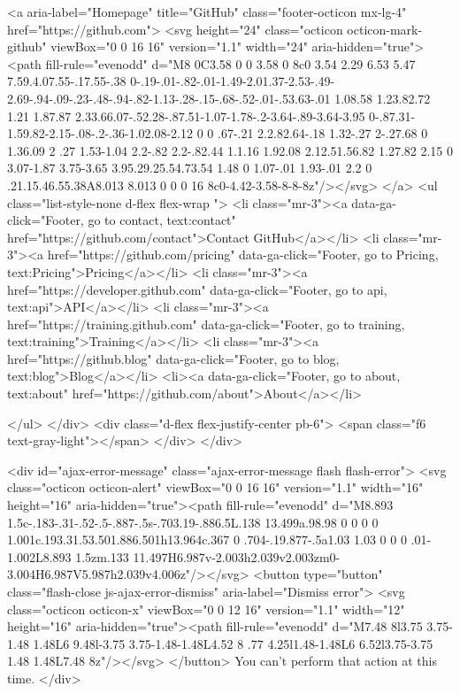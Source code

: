     <a aria-label="Homepage" title="GitHub" class="footer-octicon mx-lg-4" href="https://github.com">
      <svg height="24" class="octicon octicon-mark-github" viewBox="0 0 16 16" version="1.1" width="24" aria-hidden="true"><path fill-rule="evenodd" d="M8 0C3.58 0 0 3.58 0 8c0 3.54 2.29 6.53 5.47 7.59.4.07.55-.17.55-.38 0-.19-.01-.82-.01-1.49-2.01.37-2.53-.49-2.69-.94-.09-.23-.48-.94-.82-1.13-.28-.15-.68-.52-.01-.53.63-.01 1.08.58 1.23.82.72 1.21 1.87.87 2.33.66.07-.52.28-.87.51-1.07-1.78-.2-3.64-.89-3.64-3.95 0-.87.31-1.59.82-2.15-.08-.2-.36-1.02.08-2.12 0 0 .67-.21 2.2.82.64-.18 1.32-.27 2-.27.68 0 1.36.09 2 .27 1.53-1.04 2.2-.82 2.2-.82.44 1.1.16 1.92.08 2.12.51.56.82 1.27.82 2.15 0 3.07-1.87 3.75-3.65 3.95.29.25.54.73.54 1.48 0 1.07-.01 1.93-.01 2.2 0 .21.15.46.55.38A8.013 8.013 0 0 0 16 8c0-4.42-3.58-8-8-8z"/></svg>
</a>
   <ul class="list-style-none d-flex flex-wrap ">
        <li class="mr-3"><a data-ga-click="Footer, go to contact, text:contact" href="https://github.com/contact">Contact GitHub</a></li>
        <li class="mr-3"><a href="https://github.com/pricing" data-ga-click="Footer, go to Pricing, text:Pricing">Pricing</a></li>
      <li class="mr-3"><a href="https://developer.github.com" data-ga-click="Footer, go to api, text:api">API</a></li>
      <li class="mr-3"><a href="https://training.github.com" data-ga-click="Footer, go to training, text:training">Training</a></li>
        <li class="mr-3"><a href="https://github.blog" data-ga-click="Footer, go to blog, text:blog">Blog</a></li>
        <li><a data-ga-click="Footer, go to about, text:about" href="https://github.com/about">About</a></li>

    </ul>
  </div>
  <div class="d-flex flex-justify-center pb-6">
    <span class="f6 text-gray-light"></span>
  </div>
</div>



  <div id="ajax-error-message" class="ajax-error-message flash flash-error">
    <svg class="octicon octicon-alert" viewBox="0 0 16 16" version="1.1" width="16" height="16" aria-hidden="true"><path fill-rule="evenodd" d="M8.893 1.5c-.183-.31-.52-.5-.887-.5s-.703.19-.886.5L.138 13.499a.98.98 0 0 0 0 1.001c.193.31.53.501.886.501h13.964c.367 0 .704-.19.877-.5a1.03 1.03 0 0 0 .01-1.002L8.893 1.5zm.133 11.497H6.987v-2.003h2.039v2.003zm0-3.004H6.987V5.987h2.039v4.006z"/></svg>
    <button type="button" class="flash-close js-ajax-error-dismiss" aria-label="Dismiss error">
      <svg class="octicon octicon-x" viewBox="0 0 12 16" version="1.1" width="12" height="16" aria-hidden="true"><path fill-rule="evenodd" d="M7.48 8l3.75 3.75-1.48 1.48L6 9.48l-3.75 3.75-1.48-1.48L4.52 8 .77 4.25l1.48-1.48L6 6.52l3.75-3.75 1.48 1.48L7.48 8z"/></svg>
    </button>
    You can’t perform that action at this time.
  </div>


